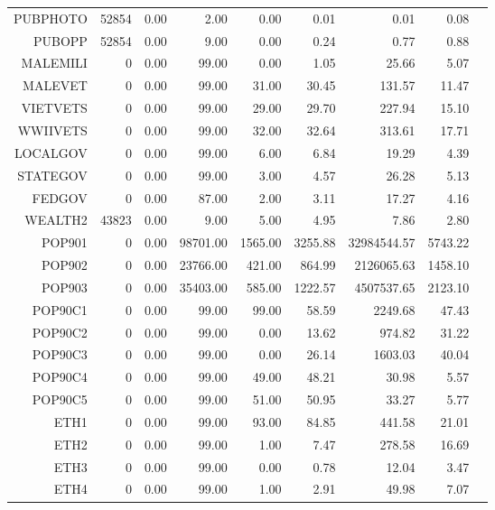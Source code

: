 \begin{longtable}{|rrrrrrrrr|}
	PUBPHOTO  &  52854  &  0.00  &  2.00  &  0.00  &  0.01  &  0.01  &  0.08 & \\
	PUBOPP  &  52854  &  0.00  &  9.00  &  0.00  &  0.24  &  0.77  &  0.88 & \\
	MALEMILI  &  0  &  0.00  &  99.00  &  0.00  &  1.05  &  25.66  &  5.07 & \\
	MALEVET  &  0  &  0.00  &  99.00  &  31.00  &  30.45  &  131.57  &  11.47 & \\
	VIETVETS  &  0  &  0.00  &  99.00  &  29.00  &  29.70  &  227.94  &  15.10 & \\
	WWIIVETS  &  0  &  0.00  &  99.00  &  32.00  &  32.64  &  313.61  &  17.71 & \\
	LOCALGOV  &  0  &  0.00  &  99.00  &  6.00  &  6.84  &  19.29  &  4.39 & \\
	STATEGOV  &  0  &  0.00  &  99.00  &  3.00  &  4.57  &  26.28  &  5.13 & \\
	FEDGOV  &  0  &  0.00  &  87.00  &  2.00  &  3.11  &  17.27  &  4.16 & \\
	WEALTH2  &  43823  &  0.00  &  9.00  &  5.00  &  4.95  &  7.86  &  2.80 & \\
	POP901  &  0  &  0.00  &  98701.00  &  1565.00  &  3255.88  &  32984544.57  &  5743.22 & \\
	POP902  &  0  &  0.00  &  23766.00  &  421.00  &  864.99  &  2126065.63  &  1458.10 & \\
	POP903  &  0  &  0.00  &  35403.00  &  585.00  &  1222.57  &  4507537.65  &  2123.10 & \\
	POP90C1  &  0  &  0.00  &  99.00  &  99.00  &  58.59  &  2249.68  &  47.43 & \\
	POP90C2  &  0  &  0.00  &  99.00  &  0.00  &  13.62  &  974.82  &  31.22 & \\
	POP90C3  &  0  &  0.00  &  99.00  &  0.00  &  26.14  &  1603.03  &  40.04 & \\
	POP90C4  &  0  &  0.00  &  99.00  &  49.00  &  48.21  &  30.98  &  5.57 & \\
	POP90C5  &  0  &  0.00  &  99.00  &  51.00  &  50.95  &  33.27  &  5.77 & \\
	ETH1  &  0  &  0.00  &  99.00  &  93.00  &  84.85  &  441.58  &  21.01 & \\
	ETH2  &  0  &  0.00  &  99.00  &  1.00  &  7.47  &  278.58  &  16.69 & \\
	ETH3  &  0  &  0.00  &  99.00  &  0.00  &  0.78  &  12.04  &  3.47 & \\
	ETH4  &  0  &  0.00  &  99.00  &  1.00  &  2.91  &  49.98  &  7.07 & \\

\end{longtable}
